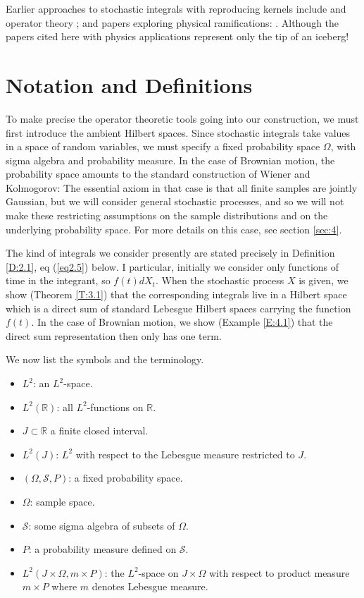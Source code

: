 \documentclass{amsart}
\theoremstyle{definition}
\theoremstyle{remark}
\numberwithin{equation}{section}
\begin{document}
Earlier approaches to stochastic integrals with reproducing kernels include 
\cite{AL08a, AAL08, AL08b} and operator theory \cite{JM08}; and papers 
exploring physical ramifications: \cite{BC97, BDGJL07, Hu07a, Hu07b}. Although 
the papers cited here with physics applications represent only the tip of an 
iceberg!

\section{Notation and Definitions}
\label{sec:2}

To make precise the operator theoretic tools going into our construction, we 
must first introduce the ambient Hilbert spaces. Since stochastic integrals 
take values in a space of random variables, we must specify a fixed 
probability space $\Omega$, with sigma algebra and probability measure. In 
the case of Brownian motion, the probability space amounts to  the standard 
construction of Wiener and Kolmogorov: The essential axiom in that case is 
that all finite samples are jointly Gaussian, but we will consider general 
stochastic processes, and so we will not make these restricting assumptions 
on the sample distributions and on the underlying probability space. For more 
details on this case, see section \ref{sec:4}.

The kind of integrals we consider presently are stated precisely in 
Definition \ref{D:2.1}, eq (\ref{eq2.5}) below. I particular, initially we 
consider only functions of time in the integrant, so  $f(t) dX_{t}$. 
When the stochastic process  $X$ is given, we show (Theorem \ref{T:3.1})  
that the corresponding integrals live in  a Hilbert space which is a direct 
sum of standard Lebesgue Hilbert spaces carrying the function $f(t)$. In 
the case of Brownian motion, we show (Example \ref{E:4.1}) that the direct 
sum representation then only has one term. 

We now list the symbols and the terminology.
\begin{itemize}
\item $L^{2}$: an $L^{2}$-space. 
\item $L^{2}(\mathbb{R})$: all $L^{2}$-functions on $\mathbb{R}$. 
\item $J \subset \mathbb{R}$ a finite closed interval. 
\item $L^{2}(J)$: $L^{2}$ with respect to the Lebesgue measure restricted
      to $J$. 
\item $(\Omega, \mathcal{S}, P)$: a fixed probability space. 
\item $\Omega$: sample space. 
\item $\mathcal{S}$: some sigma algebra of subsets of $\Omega$. 
\item $P$: a probability measure defined on $\mathcal{S}$. 
\item $L^{2}(J \times \Omega, m \times P)$: the $L^{2}$-space on 
      $J \times \Omega$ with respect to product measure $m \times P$ where 
      $m$ denotes Lebesgue measure.
\end{itemize}
\end{document}
